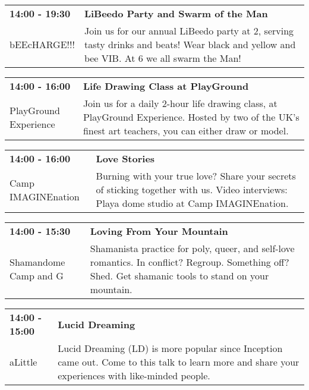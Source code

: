 \begin{tabular}{ p{1in} p{2.2in} }
    \textbf{14:00 - 19:30} & \textbf{LiBeedo Party and Swarm of the Man} \\
    bEEcHARGE!!! \newline  & Join us for our annual LiBeedo party at 2, serving tasty drinks and beats! Wear black and yellow and bee VIB. At 6 we all swarm the Man! \\
    \hline 
\end{tabular}
    
\begin{tabular}{ p{1in} p{2.2in} }
    \textbf{14:00 - 16:00} & \textbf{Life Drawing Class at PlayGround} \\
    PlayGround Experience \newline  & Join us for a daily 2-hour life drawing class, at PlayGround Experience. Hosted by two of the UK's finest art teachers, you can either draw or model. \\
    \hline 
\end{tabular}
    
\begin{tabular}{ p{1in} p{2.2in} }
    \textbf{14:00 - 16:00} & \textbf{Love Stories} \\
    Camp IMAGINEnation \newline  & Burning with your true love? Share your secrets of sticking together with us. Video interviews: Playa dome studio at Camp IMAGINEnation. \\
    \hline 
\end{tabular}
    
\begin{tabular}{ p{1in} p{2.2in} }
    \textbf{14:00 - 15:30} & \textbf{Loving From Your Mountain} \\
    Shamandome Camp \newline 615 and G & Shamanista practice for poly, queer, and self-love romantics. In conflict? Regroup. Something off? Shed. Get shamanic tools to stand on your mountain. \\
    \hline 
\end{tabular}
    
\begin{tabular}{ p{1in} p{2.2in} }
    \textbf{14:00 - 15:00} & \textbf{Lucid Dreaming} \\
    aLittle \newline  & Lucid Dreaming (LD) is more popular since Inception came out. Come to this talk to learn more and share your experiences with like-minded people. \\
    \hline 
\end{tabular}
    
